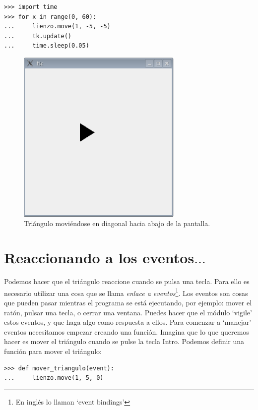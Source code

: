 \begin{listing}
\begin{verbatim}
>>> import time
>>> for x in range(0, 60):
...     lienzo.move(1, -5, -5)
...     tk.update()
...     time.sleep(0.05)
\end{verbatim}
\end{listing}

\begin{figure}
\begin{center}
\includegraphics[width=80mm]{figure45.eps}
\end{center}
\caption{Triángulo moviéndose en diagonal hacia abajo de la pantalla.}\label{fig45}
\end{figure}

\section{Reaccionando a los eventos$\ldots$}

Podemos hacer que el triángulo reaccione cuando se pulsa una tecla. Para ello es necesario utilizar una cosa que se llama \emph{enlace a eventos}\footnote{En inglés lo llaman `event bindings'}.  Los eventos son cosas que pueden pasar mientras el programa se está ejecutando, por ejemplo: mover el ratón, pulsar una tecla, o cerrar una ventana. Puedes hacer que el módulo  `vigile' estos eventos, y que haga algo como respuesta a ellos.  Para comenzar a `manejar' eventos necesitamos empezar creando una función.  Imagina que lo que queremos hacer es mover el triángulo cuando se pulse la tecla Intro. Podemos definir una función para mover el triángulo:

\begin{listing}
\begin{verbatim}
>>> def mover_triangulo(event):
...     lienzo.move(1, 5, 0)
\end{verbatim}
\end{listing}


